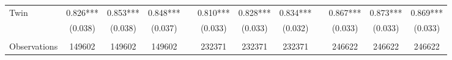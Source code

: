 \begin{table}[htpb!]
\begin{center}
{\begin{tabular}{lcccp{2mm}cccp{2mm}ccc}
Twin&0.826***&0.853***&0.848***&&0.810***&0.828***&0.834***&&0.867***&0.873***&0.869***\\
&(0.038)&(0.038)&(0.037)&&(0.033)&(0.033)&(0.032)&&(0.033)&(0.033)&(0.033)\\
\begin{footnotesize}\end{footnotesize}&\begin{footnotesize}\end{footnotesize}&\begin{footnotesize}\end{footnotesize}&\begin{footnotesize}\end{footnotesize}&\begin{footnotesize}\end{footnotesize}&\begin{footnotesize}\end{footnotesize}&\begin{footnotesize}\end{footnotesize}&\begin{footnotesize}\end{footnotesize}&\begin{footnotesize}\end{footnotesize}&\begin{footnotesize}\end{footnotesize}&\begin{footnotesize}\end{footnotesize}&\begin{footnotesize}\end{footnotesize}\\Observations&149602&149602&149602&&232371&232371&232371&&246622&246622&246622\\

\end{tabular}}
\end{center}
\end{table}
